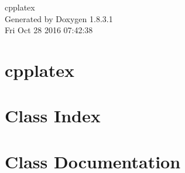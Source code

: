 \documentclass{book}
\begin{document}
\hypersetup{pageanchor=false,citecolor=blue}
\begin{titlepage}
\vspace*{7cm}
\begin{center}
{\Large cpplatex }\\
\vspace*{1cm}
{\large Generated by Doxygen 1.8.3.1}\\
\vspace*{0.5cm}
{\small Fri Oct 28 2016 07:42:38}\\
\end{center}
\end{titlepage}
\clearemptydoublepage
{}
\tableofcontents
\clearemptydoublepage
{}
\hypersetup{pageanchor=true,citecolor=blue}
\chapter{cpplatex}
\label{md_README}
\hypertarget{md_README}{}

\chapter{Class Index}

\chapter{Class Documentation}





































\printindex
\end{document}
